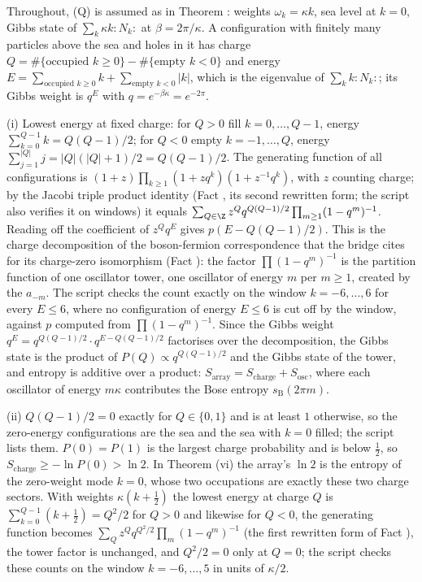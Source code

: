 Throughout, (Q) is assumed as in Theorem : weights $\omega_{k} = \kappa k$, sea level at $k = 0$, Gibbs state of $\sum_{k}\kappa k:N_{k}:$ at $\beta = 2\pi/\kappa$. A configuration with finitely many particles above the sea and holes in it has charge $Q = \#\{\text{occupied } k \ge 0\} - \#\{\text{empty } k < 0\}$ and energy $E = \sum_{\text{occupied } k \ge 0}k + \sum_{\text{empty } k < 0}|k|$, which is the eigenvalue of $\sum_{k}k:N_{k}:$; its Gibbs weight is $q^{E}$ with $q = e^{-\beta\kappa} = e^{-2\pi}$.

(i) Lowest energy at fixed charge: for $Q > 0$ fill $k = 0, \ldots, Q - 1$, energy $\sum_{k=0}^{Q-1}k = Q(Q-1)/2$; for $Q < 0$ empty $k = -1, \ldots, Q$, energy $\sum_{j=1}^{|Q|}j = |Q|(|Q| + 1)/2 = Q(Q-1)/2$. The generating function of all configurations is $(1 + z)\prod_{k \ge 1}(1 + zq^{k})(1 + z^{-1}q^{k})$, with $z$ counting charge; by the Jacobi triple product identity (Fact , its second rewritten form; the script also verifies it on windows) it equals $\sum_{Q \in \Z}z^{Q}q^{Q(Q-1)/2}\prod_{m \ge 1}(1 - q^{m})^{-1}$. Reading off the coefficient of $z^{Q}q^{E}$ gives $p(E - Q(Q-1)/2)$. This is the charge decomposition of the boson-fermion correspondence that the bridge cites for its charge-zero isomorphism (Fact ): the factor $\prod(1 - q^{m})^{-1}$ is the partition function of one oscillator tower, one oscillator of energy $m$ per $m \ge 1$, created by the $a_{-m}$. The script checks the count exactly on the window $k = -6, \ldots, 6$ for every $E \le 6$, where no configuration of energy $E \le 6$ is cut off by the window, against $p$ computed from $\prod(1 - q^{m})^{-1}$. Since the Gibbs weight $q^{E} = q^{Q(Q-1)/2}\cdot q^{E - Q(Q-1)/2}$ factorises over the decomposition, the Gibbs state is the product of $P(Q) \propto q^{Q(Q-1)/2}$ and the Gibbs state of the tower, and entropy is additive over a product: $S_{\mathrm{array}} = S_{\mathrm{charge}} + S_{\mathrm{osc}}$, where each oscillator of energy $m\kappa$ contributes the Bose entropy $s_{\mathrm{B}}(2\pi m)$.

(ii) $Q(Q-1)/2 = 0$ exactly for $Q \in \{0, 1\}$ and is at least $1$ otherwise, so the zero-energy configurations are the sea and the sea with $k = 0$ filled; the script lists them. $P(0) = P(1)$ is the largest charge probability and is below $\tfrac12$, so $S_{\mathrm{charge}} \ge -\ln P(0) > \ln 2$. In Theorem (vi) the array's $\ln 2$ is the entropy of the zero-weight mode $k = 0$, whose two occupations are exactly these two charge sectors. With weights $\kappa(k + \tfrac12)$ the lowest energy at charge $Q$ is $\sum_{k=0}^{Q-1}(k + \tfrac12) = Q^{2}/2$ for $Q > 0$ and likewise for $Q < 0$, the generating function becomes $\sum_{Q}z^{Q}q^{Q^{2}/2}\prod_{m}(1 - q^{m})^{-1}$ (the first rewritten form of Fact ), the tower factor is unchanged, and $Q^{2}/2 = 0$ only at $Q = 0$; the script checks these counts on the window $k = -6, \ldots, 5$ in units of $\kappa/2$.


